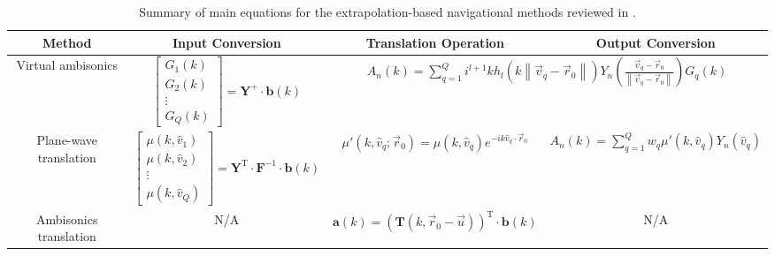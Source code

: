 \begin{sidewaystable}
\centering
\begin{tabular}{c|c|c|c}
\textbf{Method} & \textbf{Input Conversion} & \textbf{Translation Operation} & \textbf{Output Conversion} \\\hline\hline
\rule[-1.5cm]{0pt}{3.1cm} Virtual ambisonics & $\begin{bmatrix}
G_{1}(k) \\ G_{2}(k) \\ \vdots \\ G_{Q}(k)
\end{bmatrix} = \mathbf{Y}^{+} \cdot \mathbf{b}(k)$ & \multicolumn{2}{c}{$\displaystyle A_n(k) = \sum_{q = 1}^Q i^{l+1} k h_l(k \left\| \vec{v}_q - \vec{r}_0 \right\|) Y_n \left( \frac{\vec{v}_q - \vec{r}_0}{\left\| \vec{v}_q - \vec{r}_0 \right\|} \right) G_q(k)$} \\\hline
\rule[-1.5cm]{0pt}{3.1cm} Plane-wave translation & $\begin{bmatrix}
\mu(k,\hat{v}_1) \\ \mu(k,\hat{v}_2) \\ \vdots \\ \mu(k,\hat{v}_Q)
\end{bmatrix} 
= \mathbf{Y}^{\textrm{T}} \cdot \mathbf{F}^{-1} \cdot \mathbf{b}(k)$ & $\mu'(k,\hat{v}_q;\vec{r}_0) = \mu(k,\hat{v}_q) e^{-i k \hat{v}_q \cdot \vec{r}_0}$ & $\displaystyle A_n(k) = \sum_{q=1}^{Q} w_q \mu'(k,\hat{v}_q) Y_{n}(\hat{v}_q)$ \\\hline
\rule[-0.5cm]{0pt}{1.1cm} Ambisonics translation & N/A & $\mathbf{a}(k) = \left( \mathbf{T}(k, \vec{r}_0 - \vec{u}) \right)^\text{T} \cdot \mathbf{b}(k)$ & N/A
\end{tabular}
\caption[Summary of main equations for extrapolation methods.]{
Summary of main equations for the extrapolation-based navigational methods reviewed in .}
\label{tab:03_Navigational_Techniques:Extrapolation_Equations}
\end{sidewaystable}